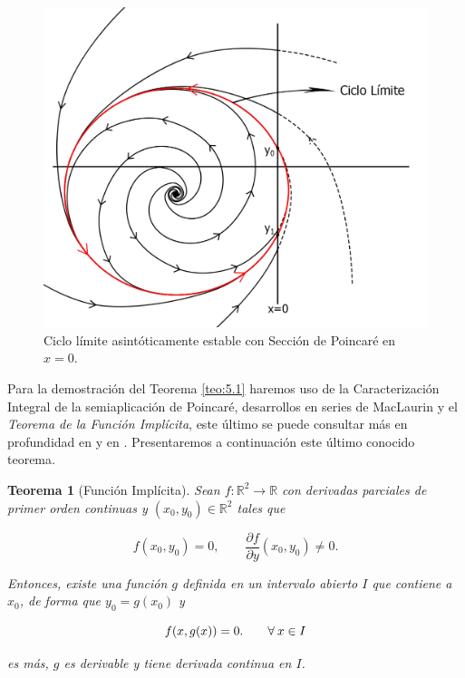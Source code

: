 \documentclass[12pt,a4paper]{report} %
\newtheorem{theorem}{Teorema}[chapter]
\begin{document}
	\newpage
	
	\begin{figure}[h]
		\centering
		\includegraphics[width=1.1\textwidth,center]{ciclolimite3x=0_v2.jpg}
		\caption{Ciclo límite asintóticamente estable con Sección de Poincaré en $x=0$.}
		\label{fig:ciclolimite3}
	\end{figure}\smallskip
	
	\newpage
	
	Para la demostración del Teorema \ref{teo:5.1} haremos uso de la Caracterización Integral de la semiaplicación de Poincaré, desarrollos en series de MacLaurin y el \textit{Teorema de la Función Implícita}, este último se puede consultar más en profundidad en \cite{tf1} y en \cite{librotfi}. Presentaremos a continuación este último conocido teorema.
	
	\begin{theorem}[Función Implícita]
		\label{teo.fi}
		Sean $f:\mathbb{R}^2 \longrightarrow\mathbb{R}$ con derivadas parciales de primer orden continuas y $(x_0,y_0) \in \mathbb{R}^2$ tales que
		
		\begin{equation*}
			f(x_0,y_0)=0, \qquad\frac{\partial f}{\partial y}(x_0,y_0)\neq 0.
		\end{equation*}\smallskip
		
		\noindent Entonces, existe una función $g$ definida en un intervalo abierto $I$ que contiene a $x_0$, de forma que $y_0=g(x_0)$ y
		
		\begin{equation*}
			\scalebox{1}{$\displaystyle
			f(x,g(x))=0. \qquad \forall \: x\in I
			$}
		\end{equation*}\smallskip
		
		\noindent es más, $g$ es derivable y tiene derivada continua en $I$.
		
	\end{theorem}
	
\end{document}
